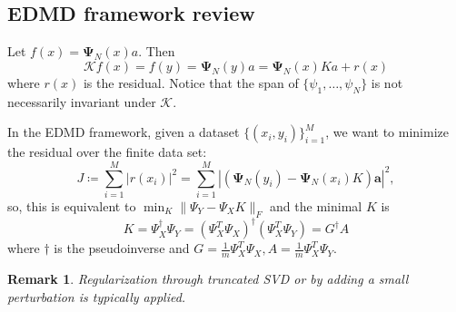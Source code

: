 \documentclass{article}[11]
\newtheorem*{remark}{Remark}
\begin{document}
\subsection*{EDMD framework review}
Let $f(x) = \mathbf{\Psi}_N(x)a$. Then 
$$\mathcal{K} f(x) = f(y) = \mathbf{\Psi}_N(y)a = \mathbf{\Psi}_N(x)K a + r(x)$$
where $r(x)$ is the residual. Notice that the span of $\{ \psi_1, \dots, \psi_N \}$ is not necessarily invariant under $\mathcal{K}$.

In the EDMD framework, given a dataset $\{(x_i,y_i)\}_{i=1}^M$, we want to minimize the residual over the finite data set:
$$J \coloneqq \sum_{i=1}^M \left| r(x_i) \right|^2 = \sum_{i=1}^M \left| \left(\mathbf{\Psi}_N(y_i) - \mathbf{\Psi}_N(x_i)K\right)\mathbf{a} \right|^2,$$
so, this is equivalent to $\min_{K} \| \Psi_Y - \Psi_X K\|_F$ and the minimal $K$ is
$$K = \Psi_X^{\dagger}\Psi_Y = (\Psi_X^T\Psi_X)^{\dagger}(\Psi_X^T\Psi_Y) = G^{\dagger}A$$
where $\dagger$ is the pseudoinverse and $G=\frac{1}{m}\Psi_X^T\Psi_X, A=\frac{1}{m}\Psi_X^T\Psi_Y$. 
\begin{remark}
	Regularization through truncated SVD or by adding a small perturbation is typically applied.
\end{remark}
\end{document}
